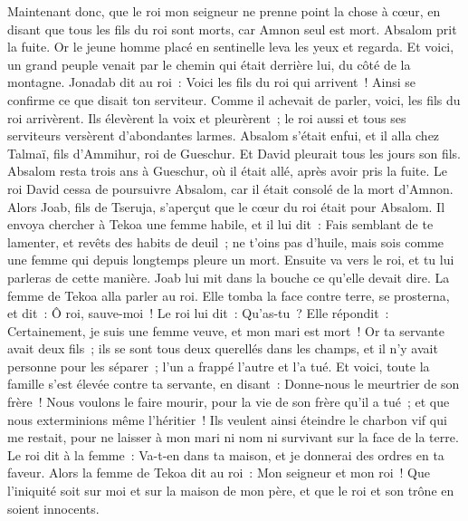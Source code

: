 \begin{multicols}{2}
Maintenant donc, que le roi mon seigneur ne prenne point la chose à cœur, en disant que tous les fils du roi sont morts, car Amnon seul est mort.
Absalom prit la fuite. Or le jeune homme placé en sentinelle leva les yeux et regarda. Et voici, un grand peuple venait par le chemin qui était derrière lui, du côté de la montagne.
Jonadab dit au roi~: Voici les fils du roi qui arrivent~! Ainsi se confirme ce que disait ton serviteur.
Comme il achevait de parler, voici, les fils du roi arrivèrent. Ils élevèrent la voix et pleurèrent~; le roi aussi et tous ses serviteurs versèrent d'abondantes larmes.
Absalom s'était enfui, et il alla chez Talmaï, fils d'Ammihur, roi de Gueschur. Et David pleurait tous les jours son fils.
Absalom resta trois ans à Gueschur, où il était allé, après avoir pris la fuite.
Le roi David cessa de poursuivre Absalom, car il était consolé de la mort d'Amnon.
\VerseOne{}Alors Joab, fils de Tseruja, s'aperçut que le cœur du roi était pour Absalom.
Il envoya chercher à Tekoa une femme habile, et il lui dit~: Fais semblant de te lamenter, et revêts des habits de deuil~; ne t'oins pas d'huile, mais sois comme une femme qui depuis longtemps pleure un mort.
Ensuite va vers le roi, et tu lui parleras de cette manière. Joab lui mit dans la bouche ce qu'elle devait dire.
La femme de Tekoa alla parler au roi. Elle tomba la face contre terre, se prosterna, et dit~: Ô roi, sauve-moi~!
Le roi lui dit~: Qu'as-tu~? Elle répondit~: Certainement, je suis une femme veuve, et mon mari est mort~!
Or ta servante avait deux fils~; ils se sont tous deux querellés dans les champs, et il n'y avait personne pour les séparer~; l'un a frappé l'autre et l'a tué.
Et voici, toute la famille s'est élevée contre ta servante, en disant~: Donne-nous le meurtrier de son frère~! Nous voulons le faire mourir, pour la vie de son frère qu'il a tué~; et que nous exterminions même l'héritier~! Ils veulent ainsi éteindre le charbon vif qui me restait, pour ne laisser à mon mari ni nom ni survivant sur la face de la terre.
Le roi dit à la femme~: Va-t-en dans ta maison, et je donnerai des ordres en ta faveur.
Alors la femme de Tekoa dit au roi~: Mon seigneur et mon roi~! Que l'iniquité soit sur moi et sur la maison de mon père, et que le roi et son trône en soient innocents.

\end{multicols}
